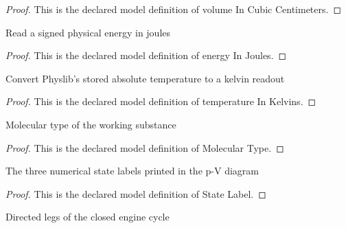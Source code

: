 \begin{proof}
  This is the declared model definition of volume In Cubic Centimeters.
\end{proof}
\begin{definition}
  \label{def:physics:phyx-mini-0434:phyxminiproblems-problemphyxmini0434-energyinjoules}
  Read a signed physical energy in joules
\end{definition}
\begin{proof}
  This is the declared model definition of energy In Joules.
\end{proof}
\begin{definition}
  \label{def:physics:phyx-mini-0434:phyxminiproblems-problemphyxmini0434-temperatureinkelvins}
  Convert Physlib's stored absolute temperature to a kelvin readout
\end{definition}
\begin{proof}
  This is the declared model definition of temperature In Kelvins.
\end{proof}
\begin{definition}
  \label{def:physics:phyx-mini-0434:phyxminiproblems-problemphyxmini0434-moleculartype}
  Molecular type of the working substance
\end{definition}
\begin{proof}
  This is the declared model definition of Molecular Type.
\end{proof}
\begin{definition}
  \label{def:physics:phyx-mini-0434:phyxminiproblems-problemphyxmini0434-statelabel}
  The three numerical state labels printed in the p-V diagram
\end{definition}
\begin{proof}
  This is the declared model definition of State Label.
\end{proof}
\begin{definition}
  \label{def:physics:phyx-mini-0434:phyxminiproblems-problemphyxmini0434-cycleleg}
  Directed legs of the closed engine cycle
\end{definition}
